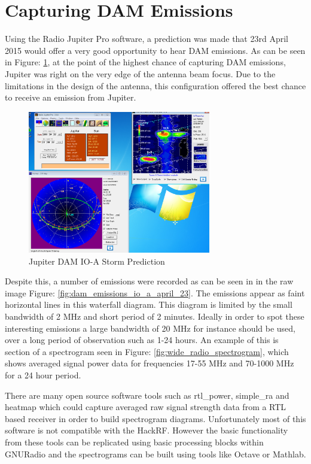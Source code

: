 \documentclass[runningheads,a4paper]{llncs}
\begin{document}
\section*{Capturing DAM Emissions}
Using the Radio Jupiter Pro software, a prediction was made that 23rd April 2015 would offer a very good opportunity to hear \gls{DAM} emissions. As can be seen in Figure: \ref{fig:dam_emissions_io_a_april_23_prediction}, at the point of the highest chance of capturing \gls{DAM} emissions, Jupiter was right on the very edge of the antenna beam focus. Due to the limitations in the design of the antenna, this configuration offered the best chance to receive an emission from Jupiter. 


%
\begin{figure}[here]
	\centering
	\includegraphics[width=8cm]{images/52}
	\caption{Jupiter \gls{DAM} IO-A Storm Prediction}
	\label{fig:dam_emissions_io_a_april_23_prediction}
\end{figure}
%

Despite this, a number of emissions were recorded as can be seen in in the raw image Figure: \ref{fig:dam_emissions_io_a_april_23}. The emissions appear as faint horizontal lines in this waterfall diagram. This diagram is limited by the small bandwidth of 2 MHz and short period of 2 minutes. Ideally in order to spot these interesting emissions a large bandwidth of 20 MHz for instance should be used, over a long period of observation such as 1-24 hours. An example of this is section of a spectrogram seen in Figure: \ref{fig:wide_radio_spectrogram}, which shows averaged signal power data for frequencies 17-55 MHz and 70-1000 MHz for a 24 hour period.

There are many open source software tools such as rtl\_power, simple\_ra and heatmap which could capture averaged raw signal strength data from a RTL based receiver in order to build spectrogram diagrams. Unfortunately most of this software is not compatible with the HackRF. However the basic functionality from these tools can be replicated using basic processing blocks within GNURadio and the spectrograms can be built using tools like Octave or Mathlab.
\end{document}
